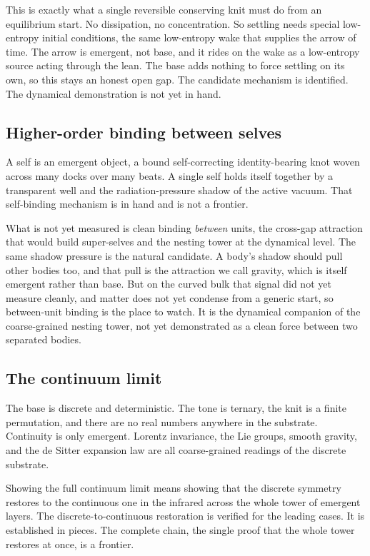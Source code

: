 This is exactly what a single reversible conserving knit must do from an equilibrium start. No dissipation, no concentration. So settling needs special low-entropy initial conditions, the same low-entropy wake that supplies the arrow of time. The arrow is emergent, not base, and it rides on the wake as a low-entropy source acting through the lean. The base adds nothing to force settling on its own, so this stays an honest open gap. The candidate mechanism is identified. The dynamical demonstration is not yet in hand.

\subsection{Higher-order binding between selves}

A self is an emergent object, a bound self-correcting identity-bearing knot woven across many docks over many beats. A single self holds itself together by a transparent well and the radiation-pressure shadow of the active vacuum. That self-binding mechanism is in hand and is not a frontier.

What is not yet measured is clean binding \emph{between} units, the cross-gap attraction that would build super-selves and the nesting tower at the dynamical level. The same shadow pressure is the natural candidate. A body's shadow should pull other bodies too, and that pull is the attraction we call gravity, which is itself emergent rather than base. But on the curved bulk that signal did not yet measure cleanly, and matter does not yet condense from a generic start, so between-unit binding is the place to watch. It is the dynamical companion of the coarse-grained nesting tower, not yet demonstrated as a clean force between two separated bodies.

\subsection{The continuum limit}

The base is discrete and deterministic. The tone is ternary, the knit is a finite permutation, and there are no real numbers anywhere in the substrate. Continuity is only emergent. Lorentz invariance, the Lie groups, smooth gravity, and the de Sitter expansion law are all coarse-grained readings of the discrete substrate.

Showing the full continuum limit means showing that the discrete symmetry restores to the continuous one in the infrared across the whole tower of emergent layers. The discrete-to-continuous restoration is verified for the leading cases. It is established in pieces. The complete chain, the single proof that the whole tower restores at once, is a frontier.

